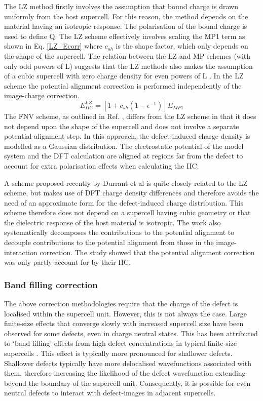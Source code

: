 \documentclass[11pt, twoside]{report}
\begin{document}
The LZ method firstly involves the assumption that bound charge is drawn uniformly from the host supercell. For this reason, the method depends on the material having an isotropic response. The polarisation of the bound charge is used to define Q. The LZ scheme effectively involves scaling the MP1 term as shown in Eq. \ref{LZ_Ecorr} where $c_{sh}$ is the shape factor, which only depends on the shape of the supercell. The relation between the LZ and MP schemes (with only odd powers of L) suggests that the LZ methods also makes the assumption of a cubic supercell with zero charge density for even powers of L \cite{Durrant_defects}. In the LZ scheme the potential alignment correction is performed independently of the image-charge correction.
\begin{equation}\label{LZ_Ecorr}
E_{IIC}^{LZ} = [1 + c_{sh} (1 - \epsilon^{-1}) ] E_{MP1}
\end{equation}
The FNV scheme, as outlined in Ref. , differs from the LZ scheme in that it does not depend upon the shape of the supercell and does not involve a separate potential alignment step. In this approach, the defect-induced charge density is modelled as a Gaussian distribution. The electrostatic potential of the model system and the DFT calculation are aligned at regions far from the defect to account for extra polarisation effects when calculating the IIC.

A scheme proposed recently by Durrant et al \cite{Durrant_defects} is quite closely related to the LZ scheme, but makes use of DFT charge density differences and therefore avoids the need of an approximate form for the defect-induced charge distribution. This scheme therefore does not depend on a supercell having cubic geometry or that the dielectric response of the host material is isotropic. The work also systematically decomposes the contributions to the potential alignment to decouple contributions to the potential alignment from those in the image-interaction correction. The study showed that the potential alignment correction was only partly account for by their IIC.


\subsubsection{Band filling correction}

The above correction methodologies require that the charge of the defect is localised within the supercell unit. However, this is not always the case. Large finite-size effects that converge slowly with increased supercell size have been observed for some defects, even in charge neutral states. This has been attributed to ‘band filling’ effects from high defect concentrations in typical finite-size supercells \cite{Lany_defects_2008, CIS_defects, pylada}. This effect is typically more pronounced for shallower defects. Shallower defects typically have more delocalised wavefunctions associated with them, therefore increasing the likelihood of the defect wavefunction extending beyond the boundary of the supercell unit. Consequently, it is possible for even neutral defects to interact with defect-images in adjacent supercells. 
\end{document}
